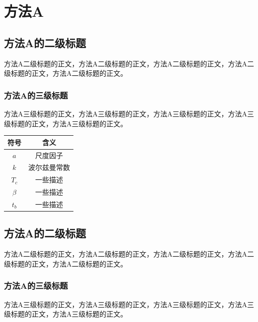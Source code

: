 \section{方法A\label{方法A}}


\subsection{方法A的二级标题}

方法A二级标题的正文，方法A二级标题的正文，方法A二级标题的正文，方法A二级标题的正文，方法A二级标题的正文。

\subsubsection{方法A的三级标题}

方法A三级标题的正文，方法A三级标题的正文，方法A三级标题的正文，方法A三级标题的正文，方法A三级标题的正文。

\begin{table}[htb]
    \centering
    \captionsetup{font=footnotesize}
    \label{tab:符号对照表A}
    \begin{tabular}{@{}cc@{}}
        \toprule
        符号     & 含义       \\ 
        \midrule
        $a$     & 尺度因子    \\
        $k$     & 波尔兹曼常数 \\
        $T_c$   & 一些描述    \\
        $\beta$ & 一些描述    \\
        $t_b$   & 一些描述    \\
        \bottomrule
    \end{tabular}
\end{table}


\subsection{方法A的二级标题}

方法A二级标题的正文，方法A二级标题的正文，方法A二级标题的正文，方法A二级标题的正文，方法A二级标题的正文。

\subsubsection{方法A的三级标题}

方法A三级标题的正文，方法A三级标题的正文，方法A三级标题的正文，方法A三级标题的正文，方法A三级标题的正文。